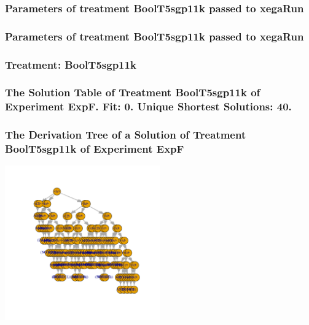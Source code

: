 \documentclass[18pt,c]{beamer}
\begin{document}

 \begin{frame}
 \fontsize{8pt}{9pt}\selectfont
 \frametitle{  Parameters of treatment BoolT5sgp11k passed to xegaRun
 }

 \label{ExpFtParmTable038.tex}  
 \end{frame}


 \begin{frame}
 \fontsize{8pt}{9pt}\selectfont
 \frametitle{  Parameters of treatment BoolT5sgp11k passed to xegaRun
 }

 \label{ExpFtParmTable039.tex}  
 \end{frame}

 \begin{frame}
 \fontsize{8pt}{9pt}\selectfont
 \frametitle{ Treatment: BoolT5sgp11k }

 \label{ExpFStatsTable015.tex}  
 \end{frame}

 \begin{frame}
 \fontsize{8pt}{9pt}\selectfont
 \frametitle{ The Solution Table of Treatment BoolT5sgp11k of Experiment ExpF. Fit: 0. Unique Shortest Solutions: 40. }

 \label{ExpFSolutionTable009.tex}  
 \end{frame}

 \begin{frame}
 \frametitle{ The Derivation Tree of a Solution of Treatment BoolT5sgp11k of Experiment ExpF }
 \begin{center}
\includegraphics[width=0.5\textwidth, angle=0]
{ExpFDerivationTreeFigure009.pdf}
 \end{center}
 \label{report/ExpFDerivationTreeFigure009.pdf}  
 \end{frame}
\end{document}
